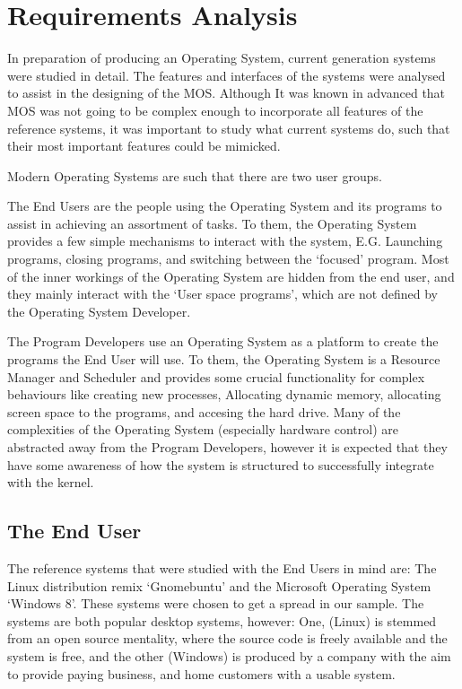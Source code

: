 \documentclass[a4paper]{report}
\begin{document}
\clearpage
\chapter{Requirements Analysis}

In preparation of producing an Operating System, current generation systems were studied in detail. The features and interfaces of the systems were analysed to assist in the designing of the MOS. Although It was known in advanced that MOS was not going to be complex enough to incorporate all features of the reference systems, it was important to study what current systems do, such that their most important features could be mimicked.

Modern Operating Systems are such that there are two user groups.


The End Users are the people using the Operating System and its programs to assist in achieving an assortment of tasks. To them, the Operating System provides a few simple mechanisms to interact with the system, E.G. Launching programs, closing programs, and switching between the `focused' program. Most of the inner workings of the Operating System are hidden from the end user, and they mainly interact with the `User space programs', which are not defined by the Operating System Developer.


The Program Developers use an Operating System as a platform to create the programs the End User will use. To them, the Operating System is a Resource Manager and Scheduler and provides some crucial functionality for complex behaviours like creating new processes, Allocating dynamic memory, allocating screen space to the programs, and accesing the hard drive. Many of the complexities of the Operating System (especially hardware control) are abstracted away from the Program Developers, however it is expected that they have some awareness of how the system is structured to successfully integrate with the kernel.

\clearpage
\section{The End User}
The reference systems that were studied with the End Users in mind are: The Linux distribution remix `Gnomebuntu' and the Microsoft Operating System `Windows 8'. These systems were chosen to get a spread in our sample. The systems are both popular desktop systems, however: One, (Linux) is stemmed from an open source mentality, where the source code is freely available and the system is free, and the other (Windows) is produced by a company with the aim to provide paying business, and home customers with a usable system.
\end{document}
